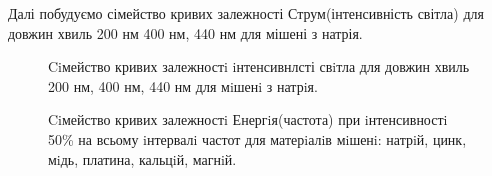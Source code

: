 \documentclass[a4paper,14pt]{extreport}
\begin{document}
\clearpage
\newpage
\begin{center}\end{center}
Далі побудуємо сімейство кривих залежності 
Струм(інтенсивність світла) для довжин хвиль 200 нм 400 нм, 440 нм для мішені з натрія.
\begin{figure}[h]
\caption{Ciмейство кривих залежностi iнтенсивнлсті свiтла для довжин хвиль 200 нм, 400 нм, 440 нм для мiшенi з натрiя.}
\label{ris7}
\end{figure}

\newpage
\begin{center}\end{center}
\begin{figure}[h]
\caption{Ciмейство кривих залежностi Енергiя(частота) при iнтенсивностi 50\% на всьому iнтервалi частот для матерiалiв мiшенi: натрiй, цинк, мiдь, платина, кальцiй, магнiй.}
\label{ris8}
\end{figure}
\end{document}
